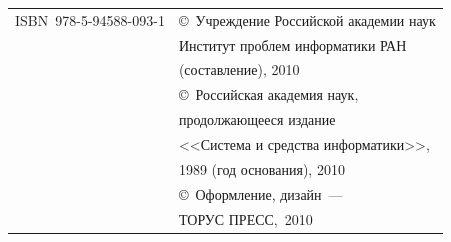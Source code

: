 \documentclass[11pt]{book}
\begin{document}













{ \footnotesize


\tabcolsep=0pt


\begin{tabular}{p{153.8pt}l}








ISBN~978-5-94588-093-1


&{\scriptsize\copyright~Учреждение Российской академии наук}\\


&{\scriptsize\hphantom{\copyright~}Институт проблем информатики РАН}\\


&{\scriptsize\hphantom{\copyright~}(составление), 2010}\\


&{\scriptsize\copyright~Российская академия наук,}\\


&{\scriptsize\hphantom{\copyright~}продолжающееся издание}\\


&{\scriptsize\hphantom{\copyright~}<<Система и средства информатики>>},\\


&{\scriptsize\hphantom{\copyright~}1989 (год основания), 2010}\\




&{\scriptsize\copyright~Оформление, дизайн~--- }\\


&{\scriptsize\hphantom{\copyright~}ТОРУС ПРЕСС,~2010}\\[1mm]








\end{tabular}


}
\end{document}
